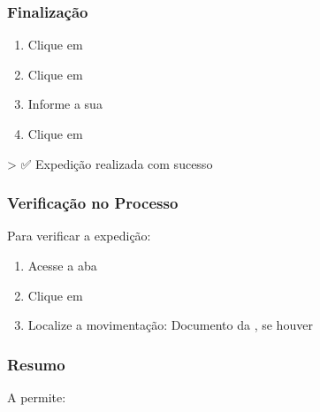 \documentclass[letterpaper,10pt,brazil]{sphinxmanual}
\begin{document}
\subsubsection{Finalização}
\label{\detokenize{projud_29_intimacaoARdigital:finalizacao}}\begin{enumerate}
%
\item {} 
\sphinxAtStartPar
Clique em 

\item {} 
\sphinxAtStartPar
Clique em 

\item {} 
\sphinxAtStartPar
Informe a sua 

\item {} 
\sphinxAtStartPar
Clique em 

\end{enumerate}

\sphinxAtStartPar
\textgreater{} ✅ Expedição realizada com sucesso


\subsubsection{Verificação no Processo}
\label{\detokenize{projud_29_intimacaoARdigital:verificacao-no-processo}}
\sphinxAtStartPar
Para verificar a expedição:
\begin{enumerate}
%
\item {} 
\sphinxAtStartPar
Acesse a aba 

\item {} 
\sphinxAtStartPar
Clique em 

\item {} 
\sphinxAtStartPar
Localize a movimentação:
\sphinxhyphen{} 
\sphinxhyphen{} Documento da 
\sphinxhyphen{} , se houver

\end{enumerate}


\subsubsection{Resumo}
\label{\detokenize{projud_29_intimacaoARdigital:resumo}}
\sphinxAtStartPar
A  permite:
\end{document}
